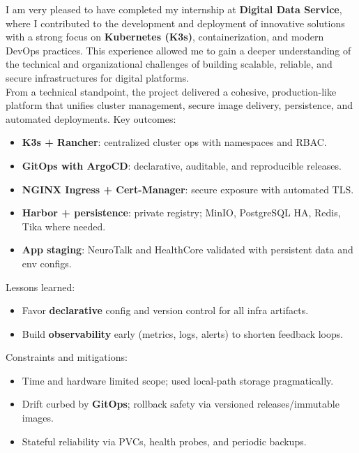 \documentclass[a4paper,12pt]{report}
\begin{document}
\begin{doublespace}
I am very pleased to have completed my internship at \textbf{Digital Data Service}, where I contributed to the development and deployment of innovative solutions with a strong focus on \textbf{Kubernetes (K3s)}, containerization, and modern DevOps practices. This experience allowed me to gain a deeper understanding of the technical and organizational challenges of building scalable, reliable, and secure infrastructures for digital platforms.\\

From a technical standpoint, the project delivered a cohesive, production-like platform that unifies cluster management, secure image delivery, persistence, and automated deployments. Key outcomes:\\
\begin{itemize}
    \item \textbf{K3s + Rancher}: centralized cluster ops with namespaces and RBAC.
    \item \textbf{GitOps with ArgoCD}: declarative, auditable, and reproducible releases.
    \item \textbf{NGINX Ingress + Cert-Manager}: secure exposure with automated TLS.
    \item \textbf{Harbor + persistence}: private registry; MinIO, PostgreSQL HA, Redis, Tika where needed.
    \item \textbf{App staging}: NeuroTalk and HealthCore validated with persistent data and env configs.
\end{itemize}

Lessons learned:
\begin{itemize}
    \item Favor \textbf{declarative} config and version control for all infra artifacts.
    \item Build \textbf{observability} early (metrics, logs, alerts) to shorten feedback loops.
\end{itemize}

Constraints and mitigations:
\begin{itemize}
    \item Time and hardware limited scope; used local-path storage pragmatically.
    \item Drift curbed by \textbf{GitOps}; rollback safety via versioned releases/immutable images.
    \item Stateful reliability via PVCs, health probes, and periodic backups.
\end{itemize}


\end{doublespace}
\end{document}
